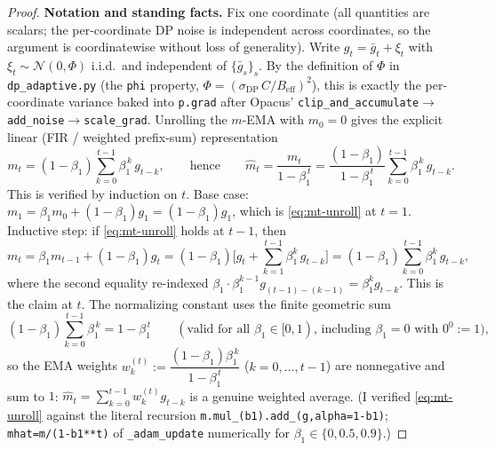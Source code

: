 \begin{proof}
\par\smallskip\noindent\textbf{Notation and standing facts.}\quad 
Fix one coordinate (all quantities are scalars; the per-coordinate DP noise is independent across
coordinates, so the argument is coordinatewise without loss of generality). Write $g_t=\bar g_t+\xi_t$
with $\xi_t\sim\mathcal N(0,\Phi)$ i.i.d.\ and independent of $\{\bar g_s\}_s$. By the definition of
$\Phi$ in \texttt{dp\_adaptive.py} (the \texttt{phi} property, $\Phi=(\sigma_{\mathrm{DP}}\,C/B_{\mathrm{eff}})^2$),
this is exactly the per-coordinate variance baked into \texttt{p.grad} after Opacus'
\texttt{clip\_and\_accumulate}$\to$\texttt{add\_noise}$\to$\texttt{scale\_grad}. Unrolling the
$m$-EMA with $m_0=0$ gives the explicit linear (FIR / weighted prefix-sum) representation
\begin{equation}\label{eq:mt-unroll}
  m_t=(1-\beta_1)\sum_{k=0}^{t-1}\beta_1^{\,k}\,g_{t-k},
  \qquad\text{hence}\qquad
  \hat m_t=\frac{m_t}{1-\beta_1^{\,t}}
  =\frac{(1-\beta_1)}{1-\beta_1^{\,t}}\sum_{k=0}^{t-1}\beta_1^{\,k}\,g_{t-k}.
\end{equation}
This is verified by induction on $t$. Base case: $m_1=\beta_1 m_0+(1-\beta_1)g_1=(1-\beta_1)g_1$,
which is \eqref{eq:mt-unroll} at $t=1$. Inductive step: if \eqref{eq:mt-unroll} holds at $t-1$, then
\[
  m_t=\beta_1 m_{t-1}+(1-\beta_1)g_t
  =(1-\beta_1)\Big[g_t+\sum_{k=1}^{t-1}\beta_1^{k}\,g_{t-k}\Big]
  =(1-\beta_1)\sum_{k=0}^{t-1}\beta_1^{k}\,g_{t-k},
\]
where the second equality re-indexed $\beta_1\!\cdot\!\beta_1^{k-1}g_{(t-1)-(k-1)}=\beta_1^{k}g_{t-k}$.
This is the claim at $t$. The normalizing constant uses the finite geometric sum
\begin{equation}\label{eq:geo}
  (1-\beta_1)\sum_{k=0}^{t-1}\beta_1^{\,k}=1-\beta_1^{\,t}
  \qquad(\text{valid for all }\beta_1\in[0,1)\text{, including }\beta_1=0\text{ with }0^0:=1),
\end{equation}
so the EMA weights $w_k^{(t)}:=\dfrac{(1-\beta_1)\beta_1^{\,k}}{1-\beta_1^{\,t}}$ ($k=0,\dots,t-1$) are
nonnegative and sum to $1$: $\hat m_t=\sum_{k=0}^{t-1}w_k^{(t)}g_{t-k}$ is a genuine weighted average.
(I verified \eqref{eq:mt-unroll} against the literal recursion \texttt{m.mul\_(b1).add\_(g,alpha=1-b1)};
\texttt{mhat=m/(1-b1**t)} of \texttt{\_adam\_update} numerically for $\beta_1\in\{0,0.5,0.9\}$.)


\end{proof}
